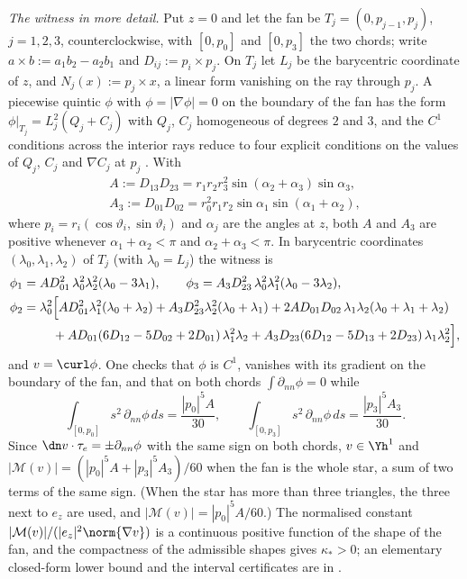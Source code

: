 \emph{The witness in more detail.} Put $z=0$ and let the fan be $T_j=(0,p_{j-1},p_j)$, $j=1,2,3$, counterclockwise, with $[0,p_0]$ and $[0,p_3]$ the two chords; write $a\times b:=a_1b_2-a_2b_1$ and $D_{ij}:=p_i\times p_j$. On $T_j$ let $L_j$ be the barycentric coordinate of $z$, and $N_j(x):=p_j\times x$, a linear form vanishing on the ray through $p_j$. A piecewise quintic $\phi$ with $\phi=|\nabla\phi|=0$ on the boundary of the fan has the form $\phi|_{T_j}=L_j^2(Q_j+C_j)$ with $Q_j$, $C_j$ homogeneous of degrees $2$ and $3$, and the $C^1$ conditions across the interior rays reduce to four explicit conditions on the values of $Q_j$, $C_j$ and $\nabla C_j$ at $p_j$ \cite{PadhiExt}. With
\begin{gather*}
A:=D_{13}D_{23}=r_1r_2r_3^2\sin(\alpha_2+\alpha_3)\sin\alpha_3,\\
A_3:=D_{01}D_{02}=r_0^2r_1r_2\sin\alpha_1\sin(\alpha_1+\alpha_2),
\end{gather*}
where $p_i=r_i(\cos\vartheta_i,\sin\vartheta_i)$ and $\alpha_j$ are the angles at $z$, both $A$ and $A_3$ are positive whenever $\alpha_1+\alpha_2<\pi$ and $\alpha_2+\alpha_3<\pi$. In barycentric coordinates $(\lambda_0,\lambda_1,\lambda_2)$ of $T_j$ (with $\lambda_0=L_j$) the witness is
\begin{align*}
\phi_1&=AD_{01}^2\,\lambda_0^2\lambda_2^2(\lambda_0-3\lambda_1),\qquad \phi_3=A_3D_{23}^2\,\lambda_0^2\lambda_1^2(\lambda_0-3\lambda_2),\\
\phi_2&=\lambda_0^2\Bigl[AD_{01}^2\lambda_1^2(\lambda_0+\lambda_2)+A_3D_{23}^2\lambda_2^2(\lambda_0+\lambda_1)+2AD_{01}D_{02}\,\lambda_1\lambda_2(\lambda_0+\lambda_1+\lambda_2)\\
&\qquad\ +AD_{01}(6D_{12}-5D_{02}+2D_{01})\,\lambda_1^2\lambda_2+A_3D_{23}(6D_{12}-5D_{13}+2D_{23})\,\lambda_1\lambda_2^2\Bigr],
\end{align*}
and $v=\curl\phi$. One checks that $\phi$ is $C^1$, vanishes with its gradient on the boundary of the fan, and that on both chords $\int\partial_{nn}\phi=0$ while
\[
\int_{[0,p_0]}s^2\,\partial_{nn}\phi\,ds=\frac{|p_0|^5A}{30},\qquad \int_{[0,p_3]}s^2\,\partial_{nn}\phi\,ds=\frac{|p_3|^5A_3}{30}.
\]
Since $\dn v\cdot\tau_e=\pm\partial_{nn}\phi$ with the same sign on both chords, $v\in\Yh^1$ and $|\mathcal M(v)|=(|p_0|^5A+|p_3|^5A_3)/60$ when the fan is the whole star, a sum of two terms of the same sign. (When the star has more than three triangles, the three next to $e_z$ are used, and $|\mathcal M(v)|=|p_0|^5A/60$.) The normalised constant $|\mathcal M(v)|/(|e_z|^2\norm{\nabla v})$ is a continuous positive function of the shape of the fan, and the compactness of the admissible shapes gives $\kappa_\ast>0$; an elementary closed-form lower bound and the interval certificates are in \cite{PadhiExt}.


